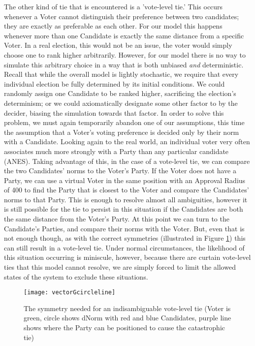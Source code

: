 \documentclass[12pt]{article}
\begin{document}
\qquad The other kind of tie that is encountered is a 'vote-level tie.' This occurs whenever a Voter cannot distinguish their preference between two candidates; they are exactly as preferable as each other. For our model this happens whenever more than one Candidate is exactly the same distance from a specific Voter. In a real election, this would not be an issue, the voter would simply choose one to rank higher arbitrarily. However, for our model there is no way to simulate this arbitrary choice in a way that is both unbiased \textit{and} deterministic. Recall that while the overall model is lightly stochastic, we require that every individual election be fully determined by its initial conditions. We could randomly assign one Candidate to be ranked higher, sacrificing the election's determinism; or we could axiomatically designate some other factor to by the decider, biasing the simulation towards that factor. In order to solve this problem, we must again temporarily abandon one of our assumptions, this time the assumption that a Voter's voting preference is decided only by their norm with a Candidate. Looking again to the real world, an individual voter very often associates much more strongly with a Party than any particular candidate (ANES). Taking advantage of this, in the case of a vote-level tie, we can compare the two Candidates' norms to the Voter's Party. If the Voter does not have a Party, we can use a virtual Voter in the same position with an Approval Radius of 400 to find the Party that is closest to the Voter and compare the Candidates' norms to that Party. This is enough to resolve almost all ambiguities, however it is still possible for the tie to persist in this situation if the Candidates are both the same distance from the Voter's Party. At this point we can turn to the Candidate's Parties, and compare their norms with the Voter. But, even that is not enough though, as with the correct symmetries (illustrated in Figure \ref{tieSymmetry}) this can still result in a vote-level tie. Under normal circumstances, the likelihood of this situation occurring is miniscule, however, because there are curtain vote-level ties that this model cannot resolve, we are simply forced to limit the allowed states of the system to exclude these situations.
\begin{figure}[H]
\centering
\texttt{[image: vectorGcircleline]}
\caption{\footnotesize The symmetry needed for an indisambiguable vote-level tie (Voter is green, circle shows dNorm with red and blue Candidates, purple line shows where the Party can be positioned to cause the catastrophic tie)}
\label{tieSymmetry}
\end{figure}
\end{document}

